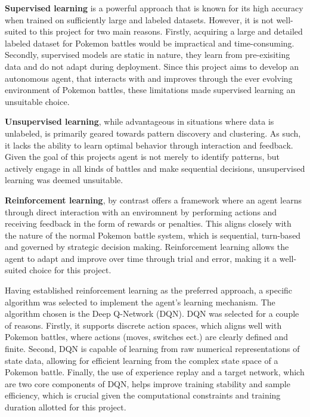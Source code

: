 \textbf{Supervised learning} is a powerful approach that is known for its high accuracy when trained on
sufficiently large and labeled datasets. However, it is not well-suited to this project for
two main reasons. Firstly, acquiring a large and detailed labeled dataset for Pokemon battles
would be impractical and time-consuming. Secondly, supervised models are static in nature, they learn
from pre-exisiting data and do not adapt during deployment. Since this project aims to develop
an autonomous agent, that interacts with and improves through the ever evolving environment of Pokemon battles, 
these limitations made supervised learning an unsuitable choice.

\textbf{Unsupervised learning}, while advantageous in situations where data is unlabeled, is primarily
geared towards pattern discovery and clustering. As such, it lacks the ability to learn 
optimal behavior through interaction and feedback. Given the goal of this projects agent is not
merely to identify patterns, but actively engage in all kinds of battles and make sequential decisions,
unsupervised learning was deemed unsuitable.

\textbf{Reinforcement learning}, by contrast offers a framework where an agent learns through direct interaction
with an enviromnent by performing actions and receiving feedback in the form of rewards or penalties.
This aligns closely with the nature of the normal Pokemon battle system, which is sequential, 
turn-based and governed by strategic decision making. Reinforcement learning allows the agent to
adapt and improve over time through trial and error, making it a well-suited choice for this project.

Having established reinforcement learning as the preferred approach, a specific algorithm
was selected to implement the agent's learning mechanism. The algorithm chosen is the 
Deep Q-Network (DQN). DQN was selected for a couple of reasons. Firstly, it supports discrete 
action spaces, which aligns well with Pokemon battles, where actions (moves, switches ect.) are
clearly defined and finite. Second, DQN is capable of learning from raw numerical representations
of state data, allowing for efficient learning from the complex state space of a Pokemon battle.
Finally, the use of experience replay and a target network, which are two core components of DQN, 
helps improve training stability and sample efficiency, which is crucial given the computational constraints
and training duration allotted for this project.
